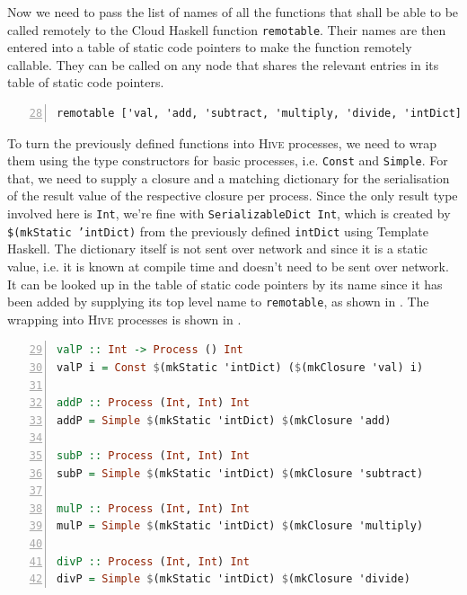 Now we need to pass the list of names of all the functions that shall be able to be called remotely to the \textsf{Cloud Haskell} function \texttt{remotable}. Their names are then entered into a table of static code pointers to make the function remotely callable. They can be called on any node that shares the relevant entries in its table of static code pointers.
\begin{lstlisting}[language=Haskell, caption=Making functions remotely callable., label=lst:arith_remotable, numbers=left, frame=bt, firstnumber=28]
remotable ['val, 'add, 'subtract, 'multiply, 'divide, 'intDict]
\end{lstlisting}

To turn the previously defined functions into \textsc{Hive} processes, we need to wrap them using the type constructors for basic processes, i.e. \texttt{Const} and \texttt{Simple}. For that, we need to supply a closure and a matching dictionary for the serialisation of the result value of the respective closure per process. Since the only result type involved here is \texttt{Int}, we're fine with \texttt{SerializableDict Int}, which is created by \texttt{\$(mkStatic 'intDict)} from the previously defined \texttt{intDict} using \textsf{Template Haskell}. The dictionary itself is not sent over network and since it is a static value, i.e. it is known at compile time and doesn't need to be sent over network. It can be looked up in the table of static code pointers by its name since it has been added by supplying its top level name to \texttt{remotable}, as shown in . The wrapping into \textsc{Hive} processes is shown in .
\begin{lstlisting}[language=Haskell, caption=Creating function closures and wrapping them into \textsc{Hive} processes., label=lst:arith_wrapping, numbers=left, frame=bt, firstnumber=29]
valP :: Int -> Process () Int
valP i = Const $(mkStatic 'intDict) ($(mkClosure 'val) i)

addP :: Process (Int, Int) Int
addP = Simple $(mkStatic 'intDict) $(mkClosure 'add)

subP :: Process (Int, Int) Int
subP = Simple $(mkStatic 'intDict) $(mkClosure 'subtract)

mulP :: Process (Int, Int) Int
mulP = Simple $(mkStatic 'intDict) $(mkClosure 'multiply)

divP :: Process (Int, Int) Int
divP = Simple $(mkStatic 'intDict) $(mkClosure 'divide)
\end{lstlisting}

